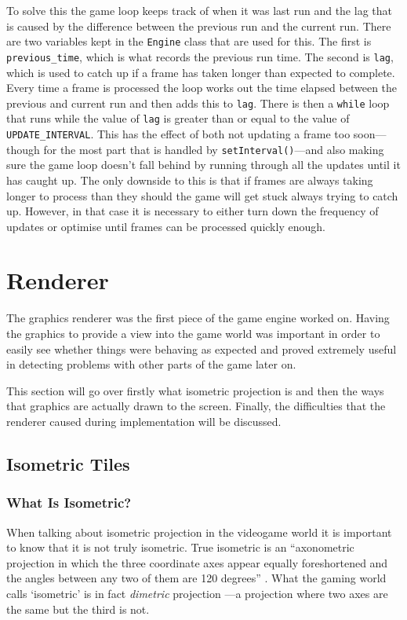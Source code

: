 To solve this the game loop keeps track of when it was last run and the lag that is caused by the difference between the previous run and the current run. There are two variables kept in the \texttt{Engine} class that are used for this. The first is \texttt{previous\_time}, which is what records the previous run time. The second is \texttt{lag}, which is used to catch up if a frame has taken longer than expected to complete. Every time a frame is processed the loop works out the time elapsed between the previous and current run and then adds this to \texttt{lag}. There is then a \texttt{while} loop that runs while the value of \texttt{lag} is greater than or equal to the value of \texttt{UPDATE\_INTERVAL}. This has the effect of both not updating a frame too soon---though for the most part that is handled by \texttt{setInterval()}---and also making sure the game loop doesn't fall behind by running through all the updates until it has caught up. The only downside to this is that if frames are always taking longer to process than they should the game will get stuck always trying to catch up. However, in that case it is necessary to either turn down the frequency of updates or optimise until frames can be processed quickly enough.

\section{Renderer}
The graphics renderer was the first piece of the game engine worked on. Having the graphics to provide a view into the game world was important in order to easily see whether things were behaving as expected and proved extremely useful in detecting problems with other parts of the game later on.

This section will go over firstly what isometric projection is and then the ways that graphics are actually drawn to the screen. Finally, the difficulties that the renderer caused during implementation will be discussed.

\subsection{Isometric Tiles}

\subsubsection{What Is Isometric?}
When talking about isometric projection in the videogame world it is important to know that it is not truly isometric. True isometric is an ``axonometric projection in which the three coordinate axes appear equally foreshortened and the angles between any two of them are 120 degrees'' . What the gaming world calls `isometric' is in fact \textit{dimetric} projection ---a projection where two axes are the same but the third is not.

